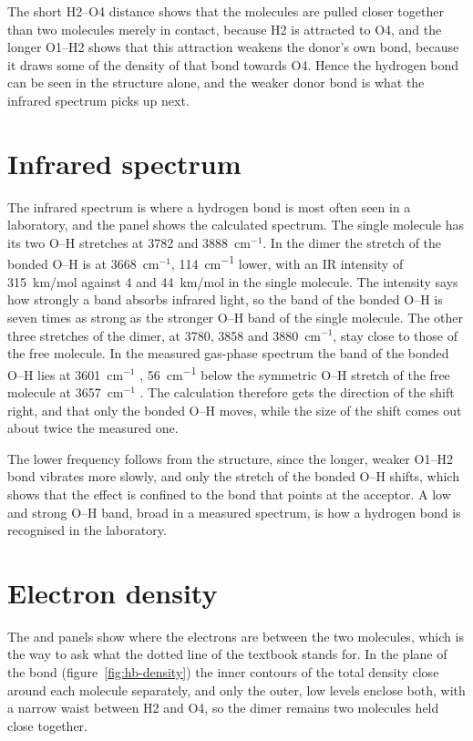 The short H2--O4 distance shows that the molecules are pulled closer together than two molecules merely in contact, because H2 is attracted to O4, and the longer O1--H2 shows that this attraction weakens the donor's own bond, because it draws some of the density of that bond towards O4. Hence the hydrogen bond can be seen in the structure alone, and the weaker donor bond is what the infrared spectrum picks up next.

\section{Infrared spectrum}
The infrared spectrum is where a hydrogen bond is most often seen in a laboratory, and the  panel shows the calculated spectrum. The single molecule has its two O--H stretches at 3782 and 3888~cm$^{-1}$. In the dimer the stretch of the bonded O--H is at 3668~cm$^{-1}$, \SI{114}{cm^{-1}} lower, with an IR intensity of 315~km/mol against 4 and 44~km/mol in the single molecule. The intensity says how strongly a band absorbs infrared light, so the band of the bonded O--H is seven times as strong as the stronger O--H band of the single molecule. The other three stretches of the dimer, at 3780, 3858 and 3880~cm$^{-1}$, stay close to those of the free molecule. In the measured gas-phase spectrum the band of the bonded O--H lies at 3601~cm$^{-1}$ \cite{huisken1996,mukhopadhyay2015}, \SI{56}{cm^{-1}} below the symmetric O--H stretch of the free molecule at 3657~cm$^{-1}$ \cite{shimanouchi1972}. The calculation therefore gets the direction of the shift right, and that only the bonded O--H moves, while the size of the shift comes out about twice the measured one.

The lower frequency follows from the structure, since the longer, weaker O1--H2 bond vibrates more slowly, and only the stretch of the bonded O--H shifts, which shows that the effect is confined to the bond that points at the acceptor. A low and strong O--H band, broad in a measured spectrum, is how a hydrogen bond is recognised in the laboratory.

\section{Electron density}
The  and  panels show where the electrons are between the two molecules, which is the way to ask what the dotted line of the textbook stands for. In the plane of the bond (figure~\ref{fig:hb-density}) the inner contours of the total density close around each molecule separately, and only the outer, low levels enclose both, with a narrow waist between H2 and O4, so the dimer remains two molecules held close together.

